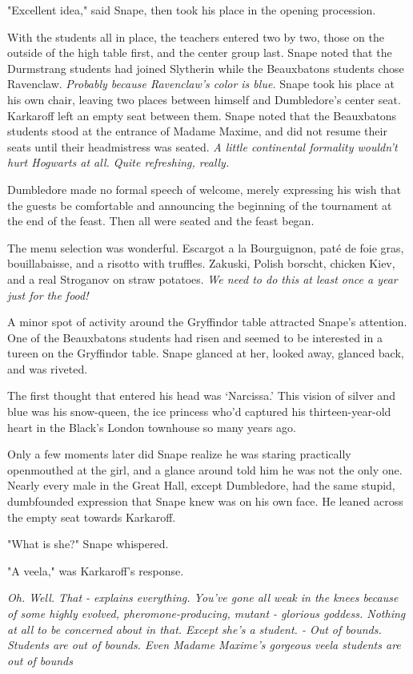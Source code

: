 "Excellent idea," said Snape, then took his place in the opening procession.

With the students all in place, the teachers entered two by two, those on the outside of the high table first, and the center group last. Snape noted that the Durmstrang students had joined Slytherin while the Beauxbatons students chose Ravenclaw. \emph{Probably because Ravenclaw's color is blue.} Snape took his place at his own chair, leaving two places between himself and Dumbledore's center seat. Karkaroff left an empty seat between them. Snape noted that the Beauxbatons students stood at the entrance of Madame Maxime, and did not resume their seats until their headmistress was seated. \emph{A little continental formality wouldn't hurt Hogwarts at all. Quite refreshing, really.}

Dumbledore made no formal speech of welcome, merely expressing his wish that the guests be comfortable and announcing the beginning of the tournament at the end of the feast. Then all were seated and the feast began.

The menu selection was wonderful. Escargot a la Bourguignon, paté de foie gras, bouillabaisse, and a risotto with truffles. Zakuski, Polish borscht, chicken Kiev, and a real Stroganov on straw potatoes. \emph{We need to do this at least once a year just for the food!}

A minor spot of activity around the Gryffindor table attracted Snape's attention. One of the Beauxbatons students had risen and seemed to be interested in a tureen on the Gryffindor table. Snape glanced at her, looked away, glanced back, and was riveted.

The first thought that entered his head was `Narcissa.' This vision of silver and blue was his snow-queen, the ice princess who'd captured his thirteen-year-old heart in the Black's London townhouse so many years ago.

Only a few moments later did Snape realize he was staring practically openmouthed at the girl, and a glance around told him he was not the only one. Nearly every male in the Great Hall, except Dumbledore, had the same stupid, dumbfounded expression that Snape knew was on his own face. He leaned across the empty seat towards Karkaroff.

"What is she?" Snape whispered.

"A veela," was Karkaroff's response.

\emph{Oh. Well. That - explains everything. You've gone all{\el} weak in the knees because of some{\el} highly evolved, pheromone-producing, mutant - glorious goddess. Nothing at all to be concerned about in that. Except she's a student. - Out of bounds. Students are out of bounds. Even Madame Maxime's gorgeous veela students are{\el} out of{\el} bounds{\el}}

